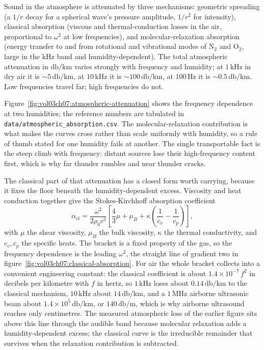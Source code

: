 Sound in the atmosphere is attenuated by three mechanisms:
geometric spreading (a $1/r$ decay for a spherical wave's pressure
amplitude, $1/r^2$ for intensity), classical absorption (viscous and
thermal-conduction losses in the air, proportional to $\omega^2$ at
low frequencies), and molecular-relaxation absorption (energy
transfer to and from rotational and vibrational modes of N$_2$ and
O$_2$, large in the kHz band and humidity-dependent). The total
atmospheric attenuation in $\si{\decibel\per\kilo\meter}$ varies
strongly with frequency and humidity; at $1\,\si{\kilo\hertz}$ in
dry air it is $\sim 5\,\si{\decibel\per\kilo\meter}$, at $10\,\si{
\kilo\hertz}$ it is $\sim 100\,\si{\decibel\per\kilo\meter}$, at
$100\,\si{\hertz}$ it is $\sim 0.5\,\si{\decibel\per\kilo\meter}$.
Low frequencies travel far; high frequencies do not.



Figure~\ref{fig:vol03ch07:atmospheric-attenuation} shows the frequency
dependence at two humidities; the reference numbers are tabulated in
\texttt{data/atmospheric\_absorption.csv}. The molecular-relaxation
contribution is what makes the curves cross rather than scale
uniformly with humidity, so a rule of thumb stated for one humidity
fails at another. The single transportable fact is the steep climb
with frequency: distant sources lose their high-frequency content
first, which is why far thunder rumbles and near thunder cracks.

The classical part of that attenuation has a closed form worth carrying,
because it fixes the floor beneath the humidity-dependent excess. Viscosity
and heat conduction together give the Stokes-Kirchhoff absorption
coefficient
\[
\alpha_{\mathrm{cl}} = \frac{\omega^2}{2\rho_0 c^3}
  \left[\frac{4}{3}\mu + \mu_B + \kappa\left(\frac{1}{c_v}-\frac{1}{c_p}
  \right)\right],
\]
with $\mu$ the shear viscosity, $\mu_B$ the bulk viscosity, $\kappa$ the
thermal conductivity, and $c_v,c_p$ the specific heats. The bracket is a
fixed property of the gas, so the frequency dependence is the leading
$\omega^2$, the straight line of gradient two in
figure~\ref{fig:vol03ch07:classical-absorption}. For air the whole bracket
collects into a convenient engineering constant: the classical coefficient
is about $1.4\times 10^{-7}\,f^2$ in decibels per kilometre with $f$ in
hertz, so $1\,\si{\kilo\hertz}$ loses about $0.14\,\si{\decibel\per\kilo
\meter}$ to the classical mechanism, $10\,\si{\kilo\hertz}$ about
$14\,\si{\decibel\per\kilo\meter}$, and a $1\,\si{\mega\hertz}$ airborne
ultrasonic beam about $1.4\times 10^{5}\,\si{\decibel\per\kilo\meter}$, or
$140\,\si{\decibel\per\meter}$, which is why airborne ultrasound reaches
only centimetres. The measured atmospheric loss of the earlier figure sits
above this line through the audible band because molecular relaxation adds a
humidity-dependent excess; the classical curve is the irreducible remainder
that survives when the relaxation contribution is subtracted.


